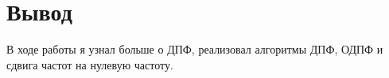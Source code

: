 \chapter{Вывод}
\label{ch:сhap5}

В ходе работы я узнал больше о ДПФ, реализовал алгоритмы ДПФ, ОДПФ и сдвига частот на нулевую частоту.
\endinput